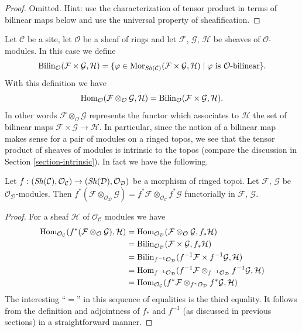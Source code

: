 \begin{proof}
Omitted. Hint: use the characterization of tensor product in terms
of bilinear maps below and use the universal property of sheafification.
\end{proof}

\noindent
Let $\mathcal{C}$ be a site, let $\mathcal{O}$ be a sheaf of rings and let
$\mathcal{F}$, $\mathcal{G}$, $\mathcal{H}$ be sheaves of
$\mathcal{O}$-modules. In this case we define
$$
\text{Bilin}_\mathcal{O}(\mathcal{F} \times \mathcal{G}, \mathcal{H})
=
\{\varphi \in
\mathop{\mathrm{Mor}}\nolimits_{\mathop{\mathit{Sh}}\nolimits(\mathcal{C})}(
\mathcal{F} \times \mathcal{G}, \mathcal{H}) \mid
\varphi \text{ is }\mathcal{O}\text{-bilinear}\}.
$$
With this definition we have
$$
\mathop{\mathrm{Hom}}\nolimits_\mathcal{O}
(\mathcal{F} \otimes_\mathcal{O} \mathcal{G}, \mathcal{H})
=
\text{Bilin}_\mathcal{O}(\mathcal{F} \times \mathcal{G}, \mathcal{H}).
$$
In other words $\mathcal{F} \otimes_\mathcal{O} \mathcal{G}$
represents the functor which associates to $\mathcal{H}$ the set
of bilinear maps $\mathcal{F} \times \mathcal{G} \to \mathcal{H}$.
In particular, since the notion of a bilinear map makes sense for
a pair of modules on a ringed topos, we see that the tensor
product of sheaves of modules is intrinsic to the topos (compare
the discussion in Section \ref{section-intrinsic}). In fact we
have the following.

\begin{lemma}
\label{lemma-tensor-product-pullback}
Let $f : (\mathop{\mathit{Sh}}\nolimits(\mathcal{C}), \mathcal{O}_\mathcal{C})
\to (\mathop{\mathit{Sh}}\nolimits(\mathcal{D}), \mathcal{O}_\mathcal{D})$ be
a morphism of ringed topoi. Let $\mathcal{F}$, $\mathcal{G}$
be $\mathcal{O}_\mathcal{D}$-modules. Then
$f^*(\mathcal{F} \otimes_{\mathcal{O}_\mathcal{D}} \mathcal{G})
= f^*\mathcal{F} \otimes_{\mathcal{O}_\mathcal{C}} f^*\mathcal{G}$
functorially in $\mathcal{F}$, $\mathcal{G}$.
\end{lemma}

\begin{proof}
For a sheaf $\mathcal{H}$ of $\mathcal{O}_\mathcal{C}$ modules we
have
\begin{align*}
\mathop{\mathrm{Hom}}\nolimits_{\mathcal{O}_\mathcal{C}}(
f^*(\mathcal{F} \otimes_\mathcal{O} \mathcal{G}), \mathcal{H})
& =
\mathop{\mathrm{Hom}}\nolimits_{\mathcal{O}_\mathcal{D}}(
\mathcal{F} \otimes_\mathcal{O} \mathcal{G}, f_*\mathcal{H}) \\
& =
\text{Bilin}_{\mathcal{O}_\mathcal{D}}(
\mathcal{F} \times \mathcal{G}, f_*\mathcal{H}) \\
& =
\text{Bilin}_{f^{-1}\mathcal{O}_\mathcal{D}}(
f^{-1}\mathcal{F} \times f^{-1}\mathcal{G}, \mathcal{H}) \\
& =
\mathop{\mathrm{Hom}}\nolimits_{f^{-1}\mathcal{O}_\mathcal{D}}(
f^{-1}\mathcal{F} \otimes_{f^{-1}\mathcal{O}_\mathcal{D}} f^{-1}\mathcal{G},
\mathcal{H}) \\
& =
\mathop{\mathrm{Hom}}\nolimits_{\mathcal{O}_\mathcal{C}}(
f^*\mathcal{F} \otimes_{f^*\mathcal{O}_\mathcal{D}} f^*\mathcal{G},
\mathcal{H})
\end{align*}
The interesting ``$=$'' in this sequence of equalities is the
third equality. It follows from the definition and adjointness of
$f_*$ and $f^{-1}$ (as discussed in previous sections) in a
straightforward manner.
\end{proof}

